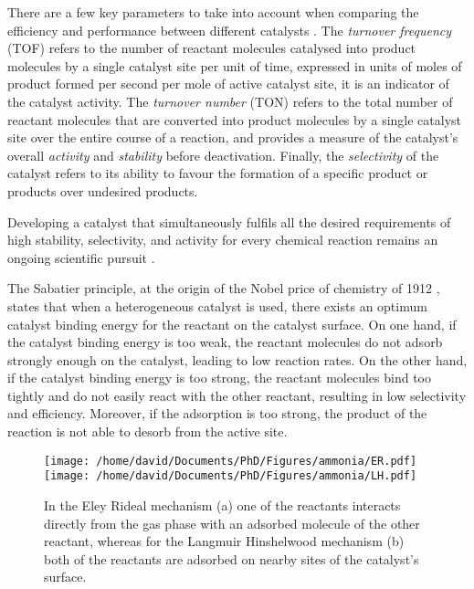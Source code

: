 There are a few key parameters to take into account when comparing the efficiency and performance between different catalysts \parencite{Boudart1995, Zhang2019, Wachs2022}.
The \textit{turnover frequency} (TOF) refers to the number of reactant molecules catalysed into product molecules by a single catalyst site per unit of time, expressed in units of moles of product formed per second per mole of active catalyst site, it is an indicator of the catalyst activity.
The \textit{turnover number} (TON) refers to the total number of reactant molecules that are converted into product molecules by a single catalyst site over the entire course of a reaction, and provides a measure of the catalyst's overall \textit{activity} and \textit{stability} before deactivation.
Finally, the \textit{selectivity} of the catalyst refers to its ability to favour the formation of a specific product or products over undesired products.

Developing a catalyst that simultaneously fulfils all the desired requirements of high stability, selectivity, and activity for every chemical reaction remains an ongoing scientific pursuit \parencite{Hagen2016}.

The Sabatier principle, at the origin of the Nobel price of chemistry of 1912 \parencite{Che2013}, states that when a heterogeneous catalyst is used, there exists an optimum catalyst binding energy for the reactant on the catalyst surface.
On one hand, if the catalyst binding energy is too weak, the reactant molecules do not adsorb strongly enough on the catalyst, leading to low reaction rates.
On the other hand, if the catalyst binding energy is too strong, the reactant molecules bind too tightly and do not easily react with the other reactant, resulting in low selectivity and efficiency.
Moreover, if the adsorption is too strong, the product of the reaction is not able to desorb from the active site.

\begin{figure}[!htb]
    \centering
    \texttt{[image: /home/david/Documents/PhD/Figures/ammonia/ER.pdf]}
    \texttt{[image: /home/david/Documents/PhD/Figures/ammonia/LH.pdf]}
    \caption{
        In the Eley Rideal mechanism (a) one of the reactants interacts directly from the gas phase with an adsorbed molecule of the other reactant, whereas for the Langmuir Hinshelwood mechanism (b) both of the reactants are adsorbed on nearby sites of the catalyst's surface.
    }
    \label{fig:Mechanisms}
\end{figure}

